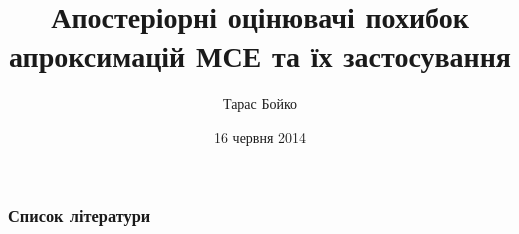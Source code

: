 \documentclass[12pt]{beamer}
\title[Апостеріорні оцінювачі похибок МСЕ]{Апостеріорні оцінювачі похибок апроксимацій МСЕ та їх застосування}
\author{Тарас Бойко}
\date{16 червня 2014}
\begin{document}
	

	
	



	\begin{frame}[allowframebreaks]
		\frametitle<presentation>{Список літератури}
		\nocite{*}
		{}
		
	\end{frame}
\end{document}
